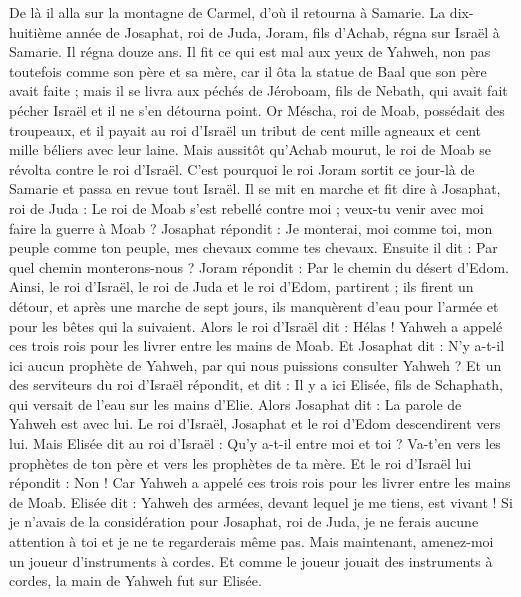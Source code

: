 \begin{multicols}{2}
De là il alla sur la montagne de Carmel, d'où il retourna à Samarie.
\VerseOne{}La dix-huitième année de Josaphat, roi de Juda, Joram, fils d'Achab, régna sur Israël à Samarie. Il régna douze ans.
Il fit ce qui est mal aux yeux de Yahweh, non pas toutefois comme son père et sa mère, car il ôta la statue de Baal que son père avait faite ;
mais il se livra aux péchés de Jéroboam, fils de Nebath, qui avait fait pécher Israël et il ne s'en détourna point.
Or Méscha, roi de Moab, possédait des troupeaux, et il payait au roi d'Israël un tribut de cent mille agneaux et cent mille béliers avec leur laine.
Mais aussitôt qu'Achab mourut, le roi de Moab se révolta contre le roi d'Israël.
C'est pourquoi le roi Joram sortit ce jour-là de Samarie et passa en revue tout Israël.
Il se mit en marche et fit dire à Josaphat, roi de Juda : Le roi de Moab s'est rebellé contre moi ; veux-tu venir avec moi faire la guerre à Moab ? Josaphat répondit : Je monterai, moi comme toi, mon peuple comme ton peuple, mes chevaux comme tes chevaux.
Ensuite il dit : Par quel chemin monterons-nous ? Joram répondit : Par le chemin du désert d'Edom.
Ainsi, le roi d'Israël, le roi de Juda et le roi d'Edom, partirent ; ils firent un détour, et après une marche de sept jours, ils manquèrent d'eau pour l'armée et pour les bêtes qui la suivaient.
Alors le roi d'Israël dit : Hélas ! Yahweh a appelé ces trois rois pour les livrer entre les mains de Moab.
Et Josaphat dit : N'y a-t-il ici aucun prophète de Yahweh, par qui nous puissions consulter Yahweh ? Et un des serviteurs du roi d'Israël répondit, et dit : Il y a ici Elisée, fils de Schaphath, qui versait de l'eau sur les mains d'Elie.
Alors Josaphat dit : La parole de Yahweh est avec lui. Le roi d'Israël, Josaphat et le roi d'Edom descendirent vers lui.
Mais Elisée dit au roi d'Israël : Qu'y a-t-il entre moi et toi ? Va-t'en vers les prophètes de ton père et vers les prophètes de ta mère. Et le roi d'Israël lui répondit : Non ! Car Yahweh a appelé ces trois rois pour les livrer entre les mains de Moab.
Elisée dit : Yahweh des armées, devant lequel je me tiens, est vivant ! Si je n'avais de la considération pour Josaphat, roi de Juda, je ne ferais aucune attention à toi et je ne te regarderais même pas.
Mais maintenant, amenez-moi un joueur d'instruments à cordes. Et comme le joueur jouait des instruments à cordes, la main de Yahweh fut sur Elisée.

\end{multicols}

